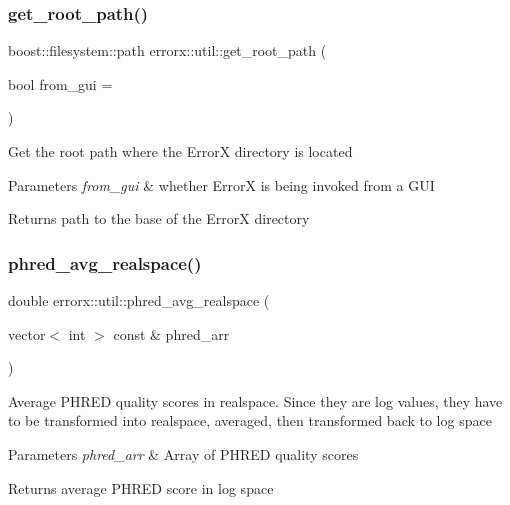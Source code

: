 \subsubsection{\texorpdfstring{get\+\_\+root\+\_\+path()}{get\_root\_path()}}
{\footnotesize\ttfamily boost\+::filesystem\+::path errorx\+::util\+::get\+\_\+root\+\_\+path (\begin{DoxyParamCaption}\item[{bool}]{from\+\_\+gui = {} }\end{DoxyParamCaption})}

Get the root path where the ErrorX directory is located


\begin{DoxyParams}{Parameters}
{\em from\+\_\+gui} & whether ErrorX is being invoked from a G\+UI\\
\hline
\end{DoxyParams}
\begin{DoxyReturn}{Returns}
path to the base of the ErrorX directory 
\end{DoxyReturn}
\mbox{\label{util_8hh_file_ab94184c848ba0a5c7d4e340a5b1dbfa7}} 
\subsubsection{\texorpdfstring{phred\+\_\+avg\+\_\+realspace()}{phred\_avg\_realspace()}}
{\footnotesize\ttfamily double errorx\+::util\+::phred\+\_\+avg\+\_\+realspace (\begin{DoxyParamCaption}\item[{vector$<$ int $>$ const \&}]{phred\+\_\+arr }\end{DoxyParamCaption})}

Average P\+H\+R\+ED quality scores in realspace. Since they are log values, they have to be transformed into realspace, averaged, then transformed back to log space


\begin{DoxyParams}{Parameters}
{\em phred\+\_\+arr} & Array of P\+H\+R\+ED quality scores\\
\hline
\end{DoxyParams}
\begin{DoxyReturn}{Returns}
average P\+H\+R\+ED score in log space 
\end{DoxyReturn}
\mbox{\label{util_8hh_file_adf449550860128c73a9261938d3077ee}} 
